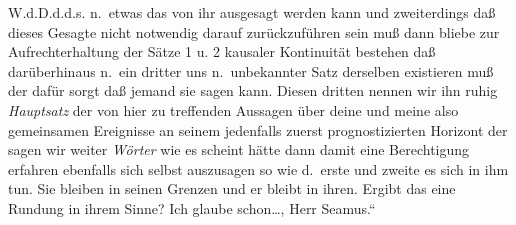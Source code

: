 \documentclass[
]{article}
\begin{document}
W.d.D.d.d.s. n.~etwas das von ihr ausgesagt werden kann und zweiterdings
daß dieses Gesagte nicht notwendig darauf zurückzuführen sein muß dann
bliebe zur Aufrechterhaltung der Sätze 1 u. 2 kausaler Kontinuität
bestehen daß darüberhinaus n.~ein dritter uns n.~unbekannter Satz
derselben existieren muß der dafür sorgt daß jemand sie sagen kann.
Diesen dritten nennen wir ihn ruhig \emph{Hauptsatz} der von hier zu
treffenden Aussagen über deine und meine also gemeinsamen Ereignisse an
seinem jedenfalls zuerst prognostizierten Horizont der sagen wir weiter
\emph{Wörter} wie es scheint hätte dann damit eine Berechtigung erfahren
ebenfalls sich selbst auszusagen so wie d.~erste und zweite es sich in
ihm tun. Sie bleiben in seinen Grenzen und er bleibt in ihren. Ergibt
das eine Rundung in ihrem Sinne? Ich glaube schon\ldots, Herr Seamus.``
\end{document}
